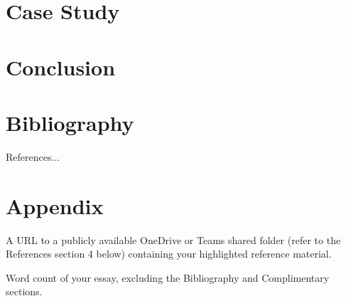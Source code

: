 \documentclass[12pt,a4paper]{article}
\begin{document}

\section{Case Study}




\section{Conclusion}




\section{Bibliography}

References...


\section{Appendix}

A URL to a publicly available OneDrive or Teams shared folder (refer to the References section 4 below) containing your highlighted reference material.

Word count of your essay, excluding the Bibliography and Complimentary sections.

\end{document}
